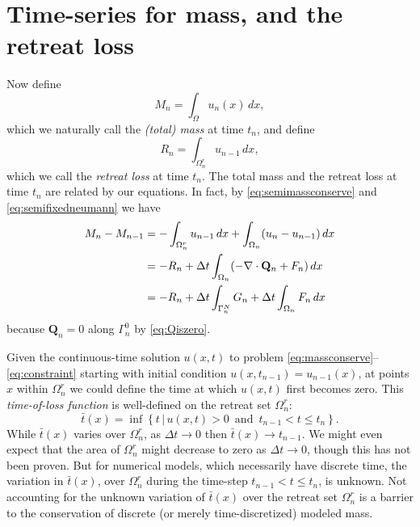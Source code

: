 \documentclass[final,leqno,onefignum,onetabnum]{siamltex1213bueler}
\newcommand\bQ{\mathbf{Q}}
\newcommand{\Div}{\nabla\cdot}
\begin{document}
\section{Time-series for mass, and the retreat loss}  \label{sec:timeseries}

Now define
\begin{equation}
M_n = \int_\Omega u_n(x)\,dx, \label{eq:totalmassdefn}
\end{equation}
which we naturally call the \emph{(total) mass} at time $t_n$, and define
\begin{equation}
R_n = \int_{\Omega_n^r} u_{n-1}\,dx, \label{eq:retreatlossdefn}
\end{equation}
which we call the \emph{retreat loss} at time $t_n$.  The total mass and the retreat loss at time $t_n$ are related by our equations.  In fact, by \eqref{eq:semimassconserve} and \eqref{eq:semifixedneumann} we have
\begin{align}
M_n - M_{n-1} &=  - \int_{\Omega_n^r} u_{n-1}\,dx + \int_{\Omega_n} (u_n - u_{n-1})\,dx \label{eq:massstep} \\
   &= - R_n + \Delta t \int_{\Omega_n} (- \Div \bQ_n + F_n) \,dx \notag \\
   &= - R_n + \Delta t \int_{\Gamma_n^N} G_n + \Delta t \int_{\Omega_n} F_n\,dx \notag
\end{align}
because $\bQ_n=0$ along $\Gamma_n^0$ by \eqref{eq:Qiszero}.

Given the continuous-time solution $u(x,t)$ to problem \eqref{eq:massconserve}--\eqref{eq:constraint} starting with initial condition $u(x,t_{n-1}) = u_{n-1}(x)$, at points $x$ within $\Omega_n^r$ we could define the time at which $u(x,t)$ first becomes zero.  This \emph{time-of-loss function} is well-defined on the retreat set $\Omega_n^r$:
\begin{equation}
\bar t(x) = \inf\left\{t \,\big|\, u(x,t)>0 \,\text{ and }\, t_{n-1} < t \le t_n\right\}.
\end{equation}
While $\bar t(x)$ varies over $\Omega_n^r$, as $\Delta t \to 0$ then $\bar t(x) \to t_{n-1}$.  We might even expect that the area of $\Omega_n^r$ might decrease to zero as $\Delta t \to 0$, though this has not been proven.  But for numerical models, which necessarily have discrete time, the variation in $\bar t(x)$, over $\Omega_n^r$ during the time-step $t_{n-1} < t \le t_n$, is unknown.  Not accounting for the unknown variation of $\bar t(x)$ over the retreat set $\Omega_n^r$ is a barrier to the conservation of discrete (or merely time-discretized) modeled mass.
\end{document}

